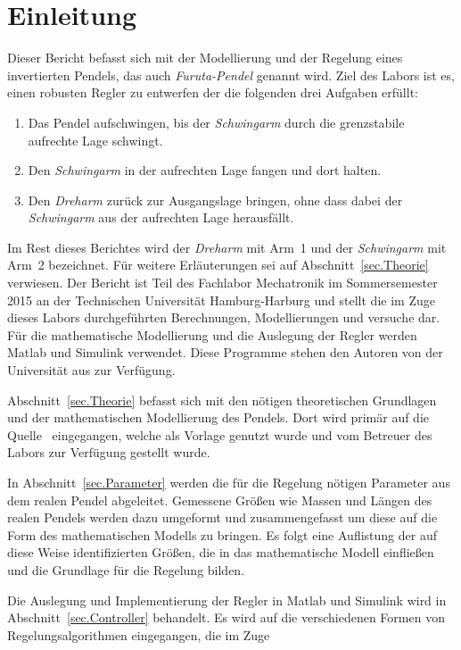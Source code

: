 \section{Einleitung}
\label{sec.Einleitung}

Dieser Bericht befasst sich mit der Modellierung und der Regelung eines invertierten Pendels, das auch \emph{Furuta-Pendel} genannt wird. 
Ziel des Labors ist es, einen robusten Regler zu entwerfen der die folgenden drei Aufgaben erfüllt:
\begin{enumerate}
	\item Das Pendel aufschwingen, bis der \emph{Schwingarm} durch die grenzstabile aufrechte Lage schwingt.
	\item Den \emph{Schwingarm} in der aufrechten Lage fangen und dort halten.
	\item Den \emph{Dreharm} zurück zur Ausgangslage bringen, ohne dass dabei der \emph{Schwingarm} aus der aufrechten Lage herausfällt.
\end{enumerate}
Im Rest dieses Berichtes wird der \emph{Dreharm} mit Arm~1 und der \emph{Schwingarm} mit Arm~2 bezeichnet.
Für weitere Erläuterungen sei auf Abschnitt~\ref{sec.Theorie} verwiesen.
Der Bericht ist Teil des Fachlabor Mechatronik im Sommersemester 2015 an der Technischen Universität Hamburg-Harburg und stellt die im Zuge dieses Labors durchgeführten Berechnungen, Modellierungen und versuche dar. 
Für die mathematische Modellierung und die Auslegung der Regler werden Matlab und Simulink verwendet.
Diese Programme stehen den Autoren von der Universität aus zur Verfügung.

Abschnitt~\ref{sec.Theorie} befasst sich mit den nötigen theoretischen Grundlagen und der mathematischen Modellierung des Pendels.
Dort wird primär auf die Quelle~\citep{Cazzolato.2011} eingegangen, welche als Vorlage genutzt wurde und vom Betreuer des Labors zur Verfügung gestellt wurde.

In Abschnitt~\ref{sec.Parameter} werden die für die Regelung nötigen Parameter aus dem realen Pendel abgeleitet. 
Gemessene Größen wie Massen und Längen des realen Pendels werden dazu umgeformt und zusammengefasst um diese auf die Form des mathematischen Modells zu bringen.
Es folgt eine Auflistung der auf diese Weise identifizierten Größen, die in das mathematische Modell einfließen und die Grundlage für die Regelung bilden.

Die Auslegung und Implementierung der Regler in Matlab und Simulink wird in Abschnitt~\ref{sec.Controller} behandelt.
Es wird auf die verschiedenen Formen von Regelungsalgorithmen eingegangen, die im Zuge 

